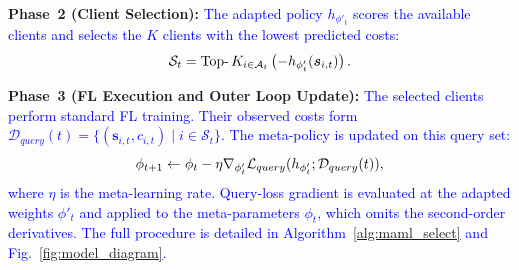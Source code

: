 \documentclass[journal]{IEEEtran}
\newcommand{\revision}[1]{\textcolor{blue}{#1}}
\begin{document}
\textbf{Phase~2 (Client Selection):}
\revision{The adapted policy $h_{\phi'_t}$ scores the available clients and selects the $K$ clients with the lowest predicted costs:}
\begin{equation}
	\color{black}
	\mathcal{S}_t = \operatorname{Top-}K_{i \in \mathcal{A}_t} \left( -h_{\phi'_t}(\bm{s}_{i,t}) \right).
	\label{eq:selection}
\end{equation}

\textbf{Phase~3 (FL Execution and Outer Loop Update):}
\revision{The selected clients perform standard FL training. Their observed costs form $\mathcal{D}_{query}(t)=\{(\bm{s}_{i,t},c_{i,t})\mid i\in\mathcal{S}_t\}$. %
The meta-policy is updated on this query set:}
\begin{equation}
		\color{black}
		\phi_{t+1} \leftarrow \phi_t - \eta \nabla_{\phi'_t} \mathcal{L}_{query}(h_{\phi'_t}; \mathcal{D}_{query}(t)),
		\label{eq:outer_loop}
\end{equation}
\revision{where $\eta$ is the meta-learning rate. %
Query-loss gradient is evaluated at the adapted weights $\phi'_t$ and applied to the meta-parameters $\phi_t$, which omits the second-order derivatives. The full procedure is detailed in Algorithm~\ref{alg:maml_select} and Fig.~\ref{fig:model_diagram}.}
\end{document}

